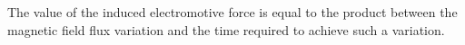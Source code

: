 The value of the induced electromotive force is equal to the product between the 
magnetic field flux variation and the
time required to achieve such a variation.
